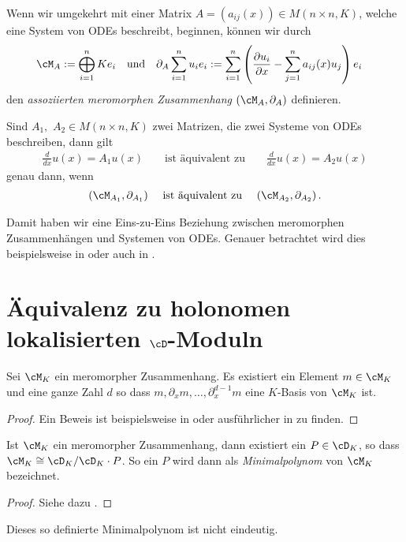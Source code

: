 \begin{defn}
Wenn wir umgekehrt mit einer Matrix $A=(a_{ij}(x))\in M(n\times n,K)$,
welche eine System von ODEs beschreibt, beginnen, können wir durch
\begin{align*}
\cM_A & :=\bigoplus_{i=1}^n Ke_i &&\text{und}
& \partial_A \sum_{i=1}^n u_ie_i &:= \sum_{i=1}^n\left(
  \frac{\partial u_i}{\partial x}-\sum_{j=1}^na_{ij}(x)u_j \right)e_i
\end{align*}
den \emph{assoziierten meromorphen Zusammenhang} $(\cM_A,\partial_A)$ definieren.
\end{defn}
\begin{comment}
TODO: zueinander inverse bijektionen?
\end{comment}
\begin{lem}
Sind $A_1,$ $A_2\in M(n\times n,K)$ zwei Matrizen, die zwei Systeme von ODEs
beschreiben, dann gilt
\begin{align*}
\frac{d}{dx}u(x)=A_1u(x) && \text{ ist äquivalent zu }
  && \frac{d}{dx}u(x)=A_2u(x)
\end{align*}
genau dann, wenn
\begin{align*}
(\cM_{A_1},\partial_{A_1}) && \text{ ist äquivalent zu }
  && (\cM_{A_2},\partial_{A_2}) \,.
\end{align*}
\end{lem}
Damit haben wir eine Eins-zu-Eins Beziehung zwischen meromorphen
Zusammenhängen und Systemen von ODEs.
Genauer betrachtet wird dies beispielsweise in \cite[Sec 5.1]{hotta2007d} oder
auch in \cite[Sec 3]{sabbah_cimpa90}.

\section{Äquivalenz zu holonomen lokalisierten $\cD$-Moduln}

\begin{lem} \label{lem:Zyklischer-Vektor}
Sei $\cM_K$ ein meromorpher Zusammenhang. Es existiert ein Element
$m\in\cM_K$ und eine ganze Zahl $d$ so dass
$m,\partial_xm,\dots,\partial_x^{d-1}m$ eine $K$-Basis von $\cM_K$ ist.
\end{lem}

\begin{proof}
Ein Beweis ist beispielsweise in \cite[Thm 4.3.3]{sabbah_cimpa90} oder
ausführlicher in \cite[Satz 4.8]{ZulaBarbara} zu finden.
\end{proof}
\begin{lemdef}
Ist $\cM_K$ ein meromorpher Zusammenhang, dann existiert ein $P\in\cD_K$, so
dass $\cM_K\cong\cD_K/\cD_K\cdot P$. So ein $P$ wird dann als
\emph{Minimalpolynom} von $\cM_K$ bezeichnet.
\end{lemdef}
\begin{proof}
Siehe dazu \cite[Satz 4.12]{ZulaBarbara}.
\begin{comment}
\cite[Thm 4.3.2]{sabbah_cimpa90}
\end{comment}
\end{proof}
\begin{bem}
Dieses so definierte Minimalpolynom ist nicht eindeutig.
\end{bem}

